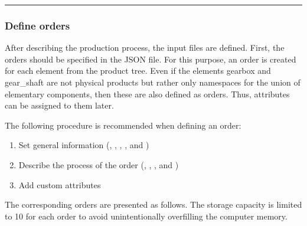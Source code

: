 \documentclass[letterpaper,10pt,english]{sphinxmanual}
\begin{document}


\bigskip\hrule\bigskip



\subsubsection{Define orders}
\label{\detokenize{source/Examples/example01:define-orders}}\label{\detokenize{source/Examples/example01:id2}}
\sphinxAtStartPar
After describing the production process, the input files are defined. First, the orders should be specified in the JSON
file. For this purpose, an order is created for each element from the product tree. Even if the elements gearbox and
gear\_shaft are not physical products but rather only namespaces for the union of elementary components, then these are
also defined as orders. Thus, attributes can be assigned to them later.

\sphinxAtStartPar
The following procedure is recommended when defining an order:
\begin{enumerate}
%
\item {} 
\sphinxAtStartPar
Set general information (, , , , and )

\item {} 
\sphinxAtStartPar
Describe the process of the order (, , , and )

\item {} 
\sphinxAtStartPar
Add custom attributes

\end{enumerate}

\sphinxAtStartPar
The corresponding orders are presented as follows. The storage capacity is limited to 10 for each order to avoid
unintentionally overfilling the computer memory.
\end{document}
